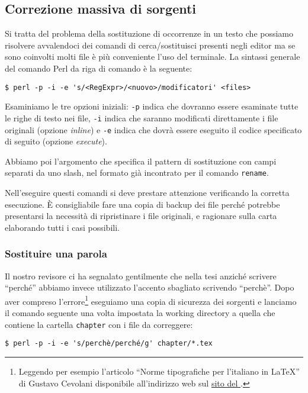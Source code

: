 \subsection{Correzione massiva di sorgenti}

Si tratta del problema della sostituzione di occorrenze in un testo che possiamo risolvere avvalendoci dei comandi di cerca/sostituisci presenti negli editor ma se sono coinvolti molti file è più conveniente l'uso del terminale. La sintassi generale del comando Perl da riga di comando è la seguente:
\begin{verbatim}
$ perl -p -i -e 's/<RegExpr>/<nuovo>/modificatori' <files>
\end{verbatim}

Esaminiamo le tre opzioni iniziali: \texttt{-p} indica che dovranno essere esaminate tutte le righe di testo nei file, \texttt{-i} indica che saranno modificati direttamente i file originali (opzione \emph{inline}) e \texttt{-e} indica che dovrà essere eseguito il codice specificato di seguito (opzione \emph{execute}).

Abbiamo poi l'argomento che specifica il pattern di sostituzione con campi separati da uno slash, nel formato già incontrato per il comando \texttt{rename}.

Nell'eseguire questi comandi si deve prestare attenzione verificando la corretta esecuzione. \`E consigliabile fare una copia di backup dei file perché potrebbe presentarsi la necessità di ripristinare i file originali, e ragionare sulla carta elaborando tutti i casi possibili.


\subsubsection{Sostituire una parola}

Il nostro revisore ci ha segnalato gentilmente che nella tesi anziché scrivere ``perché'' abbiamo invece utilizzato l'accento sbagliato scrivendo ``perchè''. Dopo aver compreso l'errore\footnote{Leggendo per esempio l'articolo ``Norme tipografiche per l’italiano in \LaTeX'' di Gustavo Cevolani disponibile all'indirizzo web sul \href{http://www.guitex.org/home/images/ArsTeXnica/AT001/norme\%20tipografiche\%20per\%20litaliano\%20in\%20latex.pdf}{sito del \GuIT*}.} eseguiamo una copia di sicurezza dei sorgenti e lanciamo il comando seguente una volta impostata la working directory a quella che contiene la cartella \texttt{chapter} con i file da correggere:
\begin{verbatim}
$ perl -p -i -e 's/perchè/perché/g' chapter/*.tex
\end{verbatim}

